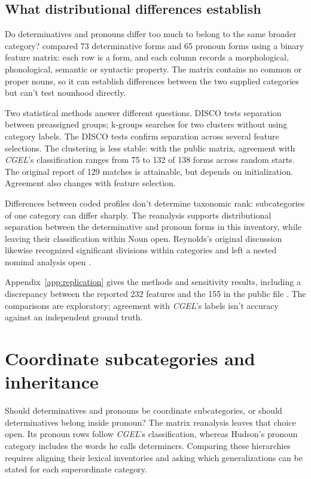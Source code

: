 \documentclass[12pt]{article}
\begin{document}
\subsection{What distributional differences establish}

Do determinatives and pronouns differ too much to belong to the same broader category? \textcite{reynolds2021} compared 73 determinative forms and 65 pronoun forms using a binary feature matrix: each row is a form, and each column records a morphological, phonological, semantic or syntactic property. The matrix contains no common or proper nouns, so it can establish differences between the two supplied categories but can't test nounhood directly.

Two statistical methods answer different questions. DISCO tests separation between preassigned groups; k-groups searches for two clusters without using category labels. The DISCO tests confirm separation across several feature selections. The clustering is less stable: with the public matrix, agreement with \textit{CGEL}'s classification ranges from 75 to 132 of 138 forms across random starts. The original report of 129 matches is attainable, but depends on initialization. Agreement also changes with feature selection.

Differences between coded profiles don't determine taxonomic rank: subcategories of one category can differ sharply. The reanalysis supports distributional separation between the determinative and pronoun forms in this inventory, while leaving their classification within Noun open. Reynolds's original discussion likewise recognized significant divisions within categories and left a nested nominal analysis open \citep{reynolds2021}.

Appendix~\ref{app:replication} gives the methods and sensitivity results, including a discrepancy between the reported 232 features and the 155 in the public file \citep{reynolds2021matrixpublic}. The comparisons are exploratory; agreement with \textit{CGEL}'s labels isn't accuracy against an independent ground truth.

\section{Coordinate subcategories and inheritance}\label{sec:inheritance}

Should determinatives and pronouns be coordinate subcategories, or should determinatives belong inside pronoun? The matrix reanalysis leaves that choice open. Its pronoun rows follow \textit{CGEL}'s classification, whereas Hudson's pronoun category includes the words he calls determiners. Comparing these hierarchies requires aligning their lexical inventories and asking which generalizations can be stated for each superordinate category.
\end{document}
